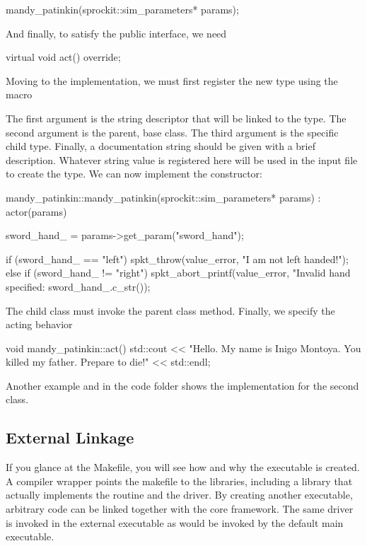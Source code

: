 \begin{CppCode}
mandy_patinkin(sprockit::sim_parameters* params);
\end{CppCode}

And finally, to satisfy the  public interface, we need

\begin{CppCode}
virtual void
act() override;
\end{CppCode}

Moving to the implementation, we must first register the new type using the macro

\begin{CppCode}
namespace sstmac {
    namespace tutorial {

SpktRegister("patinkin", actor, mandy_patinkin,
    "He's on one of those shows now... NCIS? CSI?");
\end{CppCode}
The first argument is the string descriptor that will be linked to the type.
The second argument is the parent, base class. 
The third argument is the specific child type.
Finally, a documentation string should be given with a brief description.
Whatever string value is registered here will be used in the input file to create the type.
We can now implement the constructor:

\begin{CppCode}
mandy_patinkin::mandy_patinkin(sprockit::sim_parameters* params) :
  actor(params)
{
  sword_hand_ = params->get_param("sword_hand");

  if (sword_hand_ == "left"){
    spkt_throw(value_error, "I am not left handed!");
  }
  else if (sword_hand_ != "right"){
      spkt_abort_printf(value_error,
          "Invalid hand specified: %
          sword_hand_.c_str());
  }
}
\end{CppCode}
The child class must invoke the parent class method. 
Finally, we specify the acting behavior

\begin{CppCode}
void
mandy_patinkin::act()
{
    std::cout << "Hello. My name is Inigo Montoya. You killed my father. Prepare to die!"
              << std::endl;
}
\end{CppCode}

Another example  and  in the code folder shows the implementation for the second class.

\subsection{External Linkage}\label{subsec:linkage}
If you glance at the Makefile, you will see how and why the executable is created.
A compiler wrapper  points the makefile to the \sstmacro libraries, including a library  that actually implements the  routine and the \sstmacro driver.
By creating another executable, arbitrary code can be linked together with the core \sstmacro framework.
The same \sstmacro driver is invoked in the external executable as would be invoked by the default main executable.

